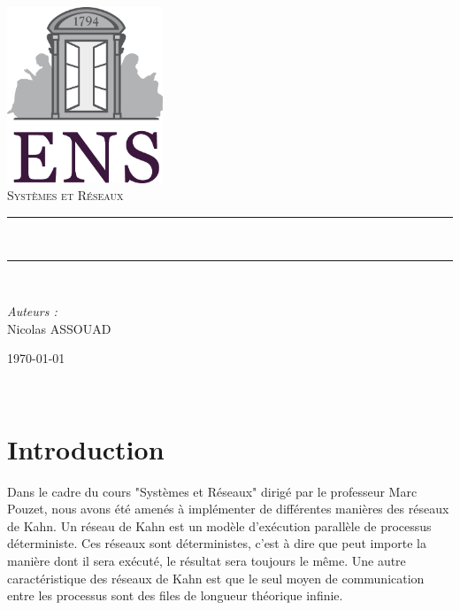 \documentclass[a4paper, 12pt, twoside]{report}
\newcommand{\HRule}{\rule{\linewidth}{0.5mm}}
\begin{document}

\begin{titlepage}
\begin{center}

\includegraphics[width=0.35\textwidth]{./ENS_Logo.png}~\\[1cm]

\textsc{\Large Systèmes et Réseaux}\\[0.5cm]

\HRule \\[0.4cm{ \huge \bfseries Réseaux de Kahn\\[0.4cm]}]

\HRule \\[1.5cm]
\end{center}

\begin{minipage}{0.4\textwidth}
\begin{flushleft} \large
\emph{Auteurs :}\\
Nicolas ASSOUAD\\
\end{flushleft}
\end{minipage}

\begin{center}
\vfill
{\large \today}

\end{center}
\end{titlepage}

\newpage~
\newpage~

\section*{Introduction}

Dans le cadre du cours "Systèmes et Réseaux" dirigé par 
le professeur Marc Pouzet, nous avons été amenés à implémenter de différentes manières des réseaux de Kahn. 
Un réseau de Kahn est un modèle d'exécution parallèle de processus déterministe. Ces réseaux sont déterministes, c'est 
à dire que peut importe la manière dont il sera exécuté, le résultat sera toujours le même. Une autre caractéristique 
des réseaux de Kahn est que le seul moyen de communication entre les processus sont des files de longueur 
théorique infinie.\\
\end{document}
